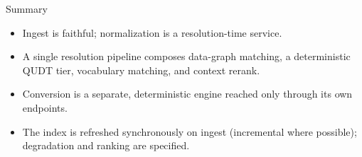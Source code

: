 \documentclass[aspectratio=169]{beamer}
\begin{document}
\begin{frame}{Summary}
  \begin{itemize}
    \item Ingest is faithful; normalization is a resolution-time service.
    \item A single resolution pipeline composes data-graph matching, a
          deterministic QUDT tier, vocabulary matching, and context rerank.
    \item Conversion is a separate, deterministic engine reached only
          through its own endpoints.
    \item The index is refreshed synchronously on ingest (incremental
          where possible); degradation and ranking are specified.
  \end{itemize}
\end{frame}
\end{document}
